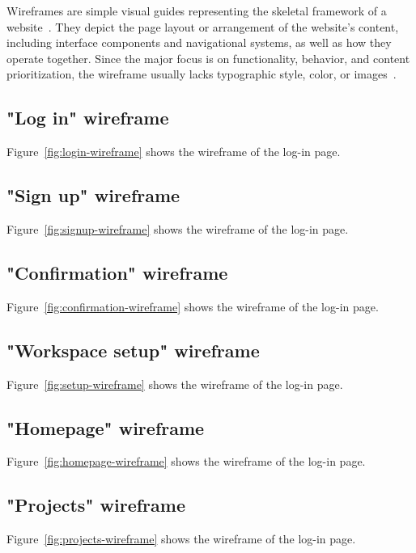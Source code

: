 Wireframes are simple visual guides representing the skeletal framework of a website~\autocite{gemayel_how_nodate}. 
They depict the page layout or arrangement of the website's content, including interface components and navigational systems, as well as how they operate together.
Since the major focus is on functionality, behavior, and content prioritization, the wireframe usually lacks typographic style, color, or images~\autocite{garrett_elements_2011}. 

\subsection{"Log in" wireframe}
Figure~\ref{fig:login-wireframe} shows the wireframe of the log-in page.


\subsection{"Sign up" wireframe}
Figure~\ref{fig:signup-wireframe} shows the wireframe of the log-in page.


\subsection{"Confirmation" wireframe}
Figure~\ref{fig:confirmation-wireframe} shows the wireframe of the log-in page.


\subsection{"Workspace setup" wireframe}
Figure~\ref{fig:setup-wireframe} shows the wireframe of the log-in page.


\subsection{"Homepage" wireframe}
Figure~\ref{fig:homepage-wireframe} shows the wireframe of the log-in page.


\subsection{"Projects" wireframe}
Figure~\ref{fig:projects-wireframe} shows the wireframe of the log-in page.

